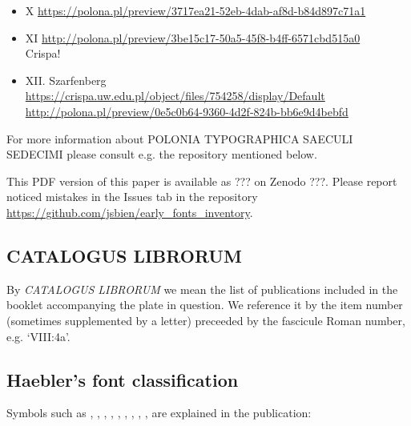 \documentclass[12pt]{article}
\begin{document}
\begin{itemize}
\item X \url{https://polona.pl/preview/3717ea21-52eb-4dab-af8d-b84d897c71a1}
\item XI 
  \url{http://polona.pl/preview/3be15c17-50a5-45f8-b4ff-6571cbd515a0}\\
  Crispa!
      \item XII. Szarfenberg\\
        {\url{https://crispa.uw.edu.pl/object/files/754258/display/Default}}
        \url{http://polona.pl/preview/0e5c0b64-9360-4d2f-824b-bb6e9d4bebfd}
      \end{itemize}


      For more information about \textsc{POLONIA TYPOGRAPHICA SAECULI
        SEDECIMI} please consult e.g. the repository mentioned below.

\bigskip

This PDF version of this paper is available as ??? on Zenodo
???. Please report noticed mistakes in the \textsf{Issues} tab in the
repository \url{https://github.com/jsbien/early_fonts_inventory}.


\subsection{CATALOGUS LIBRORUM}
\label{sec:catalogus-librorum}

By \textit{CATALOGUS LIBRORUM} we mean the list of publications
included in the booklet accompanying the plate in question. We
reference it by the item number (sometimes supplemented by a letter)
preceeded by the fascicule Roman number, e.g. `VIII:4a'.


\subsection{Haebler's font classification}
\label{sec:haebl-font-class}


Symbols such as , , , , ,
, , , ,  are explained in the
publication:
\end{document}
